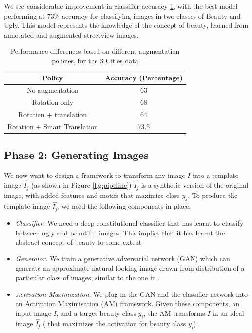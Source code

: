 We see considerable improvement in classifier accuracy \ref{tab:classifier}, with the best model performing at 73\% accuracy for classifying images in two classes of Beauty and Ugly. 
This model represents the knowledge of the concept of beauty, learned from annotated and augmented streetview images. 


\begin{table}[h]
	\centering
	\begin{tabular}{|c|c|}
		\hline
		\textbf{Policy} & \textbf{Accuracy (Percentage)}\\
		\hline
		No augmentation & 63 \\
		\hline
		Rotation only & 68 \\
		\hline
		Rotation + translation  & 64 \\
		\hline
		Rotation + Smart Translation & 73.5 \\
		\hline
		
		\hline
	\end{tabular}
	\caption{Performance differences based on different augmentation policies, for the 3 Cities data}
	\label{tab:classifier}
\end{table}



\subsection{Phase 2: Generating Images}
\par 
We now want to design a framework to transform any image $I$ into a template image $\hat{I_j}$ (as shown in Figure \ref{fig:pipeline})
$\hat{I_j}$  is  a synthetic version of the original image, with added features and motifs that maximize class $y_j$. 
To produce the template image $\hat{I_j}$, we need the following components in place,
\begin{itemize}
	\item {\textit{Classifier}}. We need a deep constitutional classifier that has learnt to classify between ugly and beautiful images. This implies that it has learnt the abstract concept of beauty to some extent
	
	\item \textit{Generator}. We train a generative adversarial network (GAN) which can generate an approximate natural looking image drawn from distribution of a particular class of images, similar to the one  in \cite{dosovitskiy2016inverting}. 
	
	\item \textit{Activation Maximization}. We plug in the GAN and the classifier network into an Activation Maximisation (AM) framework. Given these components, an input image $I$, and a target beauty class $y_i$, the AM transforms $I$ in an ideal image $\hat{I_j}$ ( that maximizes the activation for beauty class $y_i$).	
\end{itemize}
 
